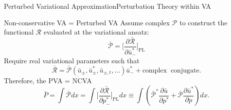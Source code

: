 \begin{frame}[c]{Perturbed Variational Approximation}{Perturbation Theory within VA}
\begin{block}{ }
\fontsize{9}{9}
\end{block}
\end{frame}

\begin{frame}[c]{Non-conservative VA = Perturbed VA}
Assume complex $\mathcal{P}$ to construct the functional $\mathcal{R}$ evaluated at the variational ansatz:
\[ \bar{\mathcal{P}} = \Bigg[ \frac{\partial \bar{\mathcal{R}}}{\partial \bar{u}_-^*} \Bigg]_{\mathrm{PL}} \]
Require real variational parameters such that
\[ \bar{\mathcal{R}} =\bar{\mathcal{P}} \left( \bar{u}_\pm, \bar{u}_\pm^*, \bar{u}_{\pm,t},\ldots \right) \bar{u}_-^*  +  \mathrm{complex \; \;  conjugate}. \]
Therefore, the PVA = NCVA
\[
\bar{P} = \int \bar{\mathcal{P}} dx =\int \Bigg[\frac{\partial \bar{\mathcal{R}}}{\partial p_-^* } \Bigg]_{\mathrm{PL}} dx \equiv \int \left(\bar{\mathcal{P}}^* \frac{\partial  \bar{u}}{\partial p^* } + \bar{\mathcal{P}} \frac{\partial  \bar{u}^*}{\partial p} \right)dx.  %
\]
%
\end{frame}


